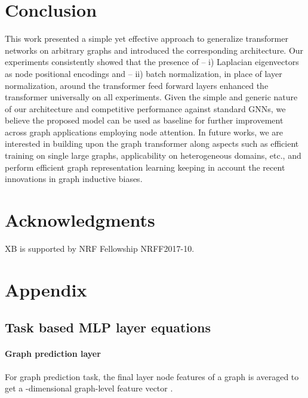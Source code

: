 \documentclass[letterpaper]{article} \usepackage{aaai21}  \usepackage{times}  \usepackage{helvet} \usepackage{courier}  \usepackage[hyphens]{url}  \usepackage{graphicx} \urlstyle{rm} \def\UrlFont{\rm}  \usepackage{natbib}  \usepackage{caption} \usepackage{xcolor}
\begin{document}
\section{Conclusion}
This work presented a simple yet effective approach to generalize transformer networks on arbitrary graphs and introduced the corresponding architecture. Our experiments consistently showed that the presence of -- i) Laplacian eigenvectors as node positional encodings and -- ii) batch normalization, in place of layer normalization, around the transformer feed forward layers enhanced the transformer universally on all experiments.
Given the simple and generic nature of our architecture and competitive performance against standard GNNs, we believe the proposed model can be used as baseline for further improvement across graph applications employing node attention. In future works, we are interested in building upon the graph transformer along aspects such as efficient training on single large graphs, applicability on heterogeneous domains, etc., and perform efficient graph representation learning keeping in account the recent innovations in graph inductive biases.














\section*{Acknowledgments}
XB is supported by NRF Fellowship NRFF2017-10.



\newpage
\appendix
\section{Appendix}




\subsection{Task based MLP layer equations}


\paragraph{Graph prediction layer}
\label{sec:task_based_layers}
For graph prediction task, the final layer node features of a graph is averaged to get a -dimensional graph-level feature vector .
\end{document}
